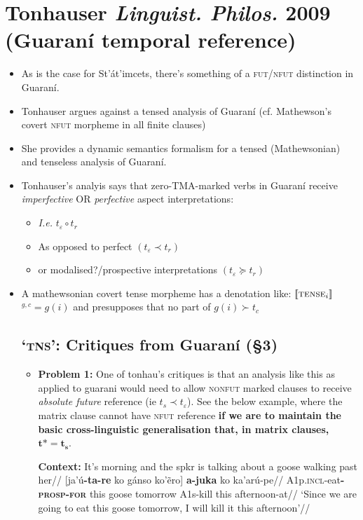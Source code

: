\documentclass[10pt]{article}
\newcommand{\denote}[1]{\mbox{$[\![\mbox{#1}]\!]$}}
\begin{document}
\section{Tonhauser \textit{Linguist. Philos. }2009 (Guaraní temporal reference)}
\begin{itemize}


\item As is the case for St'át'imcets, there's something of a \textsc{fut/nfut} distinction in Guaraní.
\item Tonhauser argues against a tensed analysis of Guaraní (cf. Mathewson's covert \textsc{nfut} morpheme in all finite clauses)
\item She provides a dynamic semantics formalism for a tensed (Mathewsonian) and tenseless analysis of Guaraní.
\item Tonhauser's analyis says that zero-TMA-marked verbs in Guaraní receive \textit{imperfective} OR \textit{perfective} aspect interpretations:
\begin{itemize}
	\item \textit{I.e.} $t_\varepsilon\circ t_r$
	\item As opposed to perfect $(t_\varepsilon\prec t_r)$
	\item or modalised?/prospective interpretations $(t_\varepsilon\succeq t_r)$
\end{itemize}
\item A mathewsonian covert tense morpheme has a denotation like:
\denote{\textsc{tense$_i$}}$^{g,c}=g(i)$ and presupposes that no part of $g(i)\succ t_c$

\subsection{\textsc{`tns'}: Critiques from Guaraní (§3)}
\begin{itemize}
	\item \textbf{Problem 1: }One of tonhau's critiques is that an analysis like this as applied to guarani would need to allow \textsc{nonfut} marked clauses to receive \textit{absolute future} reference (ie $t_s\prec t_\varepsilon$). See the below example, where the matrix clause cannot have \textsc{nfut} reference \textbf{if we are to maintain the basic cross-linguistic generalisation that, in matrix clauses, $\boldsymbol{t*=t_s}$}.
	
	\pex\begingl\glpreamble\textbf{Context:} It's morning and the spkr is talking about a goose walking past her//
	\gla{} [ja'ú\textbf{-ta-re} ko gánso ko'ẽro] \textbf{a-juka} ko ka'arú-pe//
	\glb{} A1p\textsc{.incl}-eat\textsc{\textbf{-prosp-for}} this goose tomorrow A1s-kill this afternoon-at//
	\glft`Since we are going to eat this goose tomorrow, I will kill it this afternoon'//\endgl\xe
	

\end{itemize}
\end{itemize}
\end{document}

